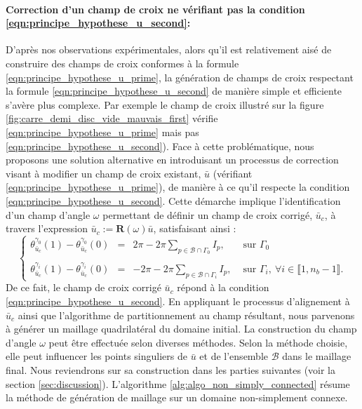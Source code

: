 \paragraph{Correction d'un champ de croix ne vérifiant pas la condition \ref{eqn:principe_hypothese_u_second}:} D'après nos observations expérimentales, alors qu'il est relativement aisé de construire des champs de croix conformes à la formule \eqref{eqn:principe_hypothese_u_prime}, la génération de champs de croix respectant la formule \eqref{eqn:principe_hypothese_u_second} de manière simple et efficiente s'avère plus complexe. Par exemple le champ de croix illustré sur la figure \ref{fig:carre_demi_disc_vide_mauvais_first} vérifie \eqref{eqn:principe_hypothese_u_prime} mais pas \eqref{eqn:principe_hypothese_u_second}). Face à cette problématique, nous proposons une solution alternative en introduisant un processus de correction visant à modifier un champ de croix existant, $\bar{u}$ (vérifiant \ref{eqn:principe_hypothese_u_prime}), de manière à ce qu'il respecte la condition \eqref{eqn:principe_hypothese_u_second}. Cette démarche implique l'identification d'un champ d'angle $\omega$ permettant de définir un champ de croix corrigé, $\bar{u}_c$, à travers l'expression $\bar{u}_c:=\mathbf{R}(\omega)\bar{u}$, satisfaisant ainsi :
\begin{equation}
    \left\{
    \begin{array}{lcll}
    \theta_{\bar{u}_c}^{\gamma_0}(1)-\theta_{\bar{u}_c}^{\gamma_0}(0)&=&2\pi-2\pi\displaystyle\sum_{p\in\mathcal{B}\cap\Gamma_0}I_p,&\mbox{ sur }\Gamma_0\\\\
    \theta_{\bar{u}_c}^{\gamma_i}(1)-\theta_{\bar{u}_c}^{\gamma_i}(0)&=&-2\pi-2\pi\displaystyle\sum_{p\in\mathcal{B}\cap\Gamma_i}I_p,&\mbox{ sur }\Gamma_i,~\forall i\in\llbracket 1, n_b-1\rrbracket.
    \end{array}
    \right.
\end{equation}
De ce fait, le champ de croix corrigé $\bar{u}_c$ répond à la condition \eqref{eqn:principe_hypothese_u_second}. En appliquant le processus d'alignement à $\bar{u}_c$ ainsi que l'algorithme de partitionnement au champ résultant, nous parvenons à générer un maillage quadrilatéral du domaine initial. La construction du champ d'angle $\omega$ peut être effectuée selon diverses méthodes. Selon la méthode choisie, elle peut influencer les points singuliers de $\bar{u}$ et de l'ensemble $\mathcal{B}$ dans le maillage final. Nous reviendrons sur sa construction dans les parties suivantes (voir la section \ref{sec:discussion}).  L'algorithme \ref{alg:algo_non_simply_connected} résume la méthode de génération de maillage sur un domaine non-simplement connexe.


